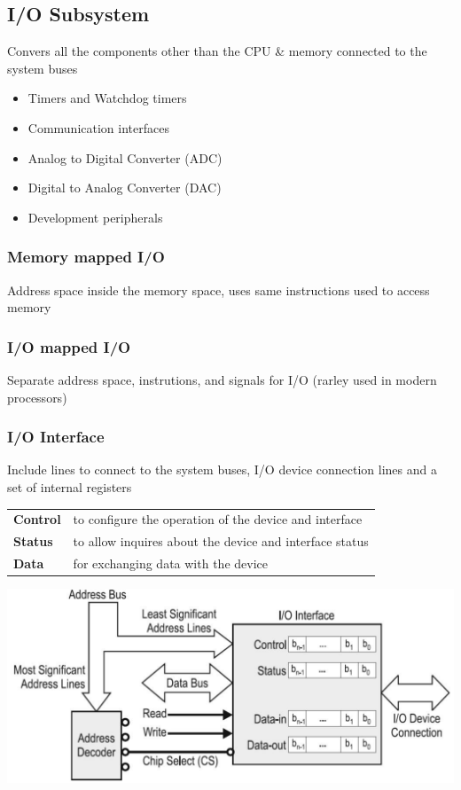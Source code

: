 \subsection{I/O Subsystem }
Convers all the components other than the \acs{CPU} \& memory connected to the system buses
\begin{itemize}
	\item Timers and Watchdog timers
	\item Communication interfaces
	\item Analog to Digital Converter (\acs{ADC})
	\item Digital to Analog Converter (\acs{DAC})
	\item Development peripherals
\end{itemize}
\begin{multicols}{2}
	\begin{minipage}{\linewidth}
		\subsubsection{Memory mapped \acs{I/O}}
		Address space inside the memory space, uses same instructions used to access memory
	\end{minipage}	
	\begin{minipage}{\linewidth}
		\subsubsection{\acs{I/O} mapped \acs{I/O}}
		Separate address space, instrutions, and signals for \acs{I/O} (rarley used in modern processors)
	\end{minipage}
\end{multicols}
\begin{minipage}{0.6\linewidth}
	\subsubsection{\acs{I/O} Interface}
	\raggedright
	Include lines to connect to the system buses, \acs{I/O} device connection lines and a set of internal registers
	\begin{tabular}{ll}
		\textbf{Control}  & to configure the operation of the device and interface  \\  
		\textbf{Status}   & to allow inquires about the device and interface status  \\ 
		\textbf{Data}     & for exchanging data with the device \\ 
	\end{tabular} 
\end{minipage}
\begin{minipage}{0.4\linewidth}
	\includegraphics[width=\linewidth]{images/IOAnatomy} 
\end{minipage}
\pagebreak
\clearpage
